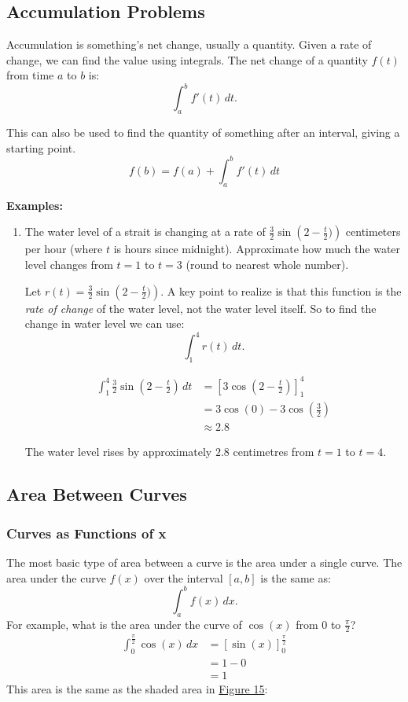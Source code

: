 \documentclass[12pt]{article}
\begin{document}
\subsection{Accumulation Problems}
Accumulation is something's net change, usually a quantity. Given a rate of change, we can find the value using integrals. The net change of a quantity $f(t)$ from time $a$ to $b$ is:
\[ \int_{a}^{b} f'(t) \, dt. \]

This can also be used to find the quantity of something after an interval, giving a starting point.
\[ f(b) = f(a) + \int_{a}^{b} f'(t) \, dt \]

\noindent \textbf{Examples:}
\begin{enumerate}
	\item The water level of a strait is changing at a rate of $\frac{3}{2} \sin \left(2- \frac{t}{2}) \right)$ centimeters per hour (where $t$ is hours since midnight). Approximate how much the water level changes from $t=1$ to $t=3$ (round to nearest whole number).

	      Let $r(t) = \frac{3}{2} \sin \left(2- \frac{t}{2}) \right)$. A key point to realize is that this function is the \textit{rate of change} of the water level, not the water level itself. So to find the change in water level we can use:
	      \[ \int_{1}^{4} r(t) \, dt. \]

	      \begin{align*}
		      \int_{1}^{4} \frac{3}{2} \sin \left(2- \frac{t}{2} \right) \, dt & = \left[ 3 \cos \left(2 - \frac{t}{2} \right) \right]_1^4 \\[6pt]
		      & = 3 \cos(0) - 3\cos \left( \frac{3}{2} \right)            \\[6pt]
		      & \approx 2.8
	      \end{align*}

	      The water level rises by approximately $2.8$ centimetres from $t=1$ to $t=4$.
\end{enumerate} %

\subsection{Area Between Curves}
\subsubsection{Curves as Functions of x}
The most basic type of area between a curve is the area under a single curve. The area under the curve $f(x)$ over the interval $[a, b]$ is the same as:
\[ \int_a^b f(x) \, dx. \]
For example, what is the area under the curve of $\cos(x)$ from $0$ to $\frac{\pi}{2}$?
\begin{align*}
	\int_0^{\frac{\pi}{2}} \cos(x) \, dx & = \left[ \sin(x) \right]_0^{\frac{\pi}{2}} \\[6pt]
	& = 1 - 0                                    \\
	& = 1
\end{align*}
This area is the same as the shaded area in \hyperref[fig:auccosx1]{Figure 15}:
\end{document}
